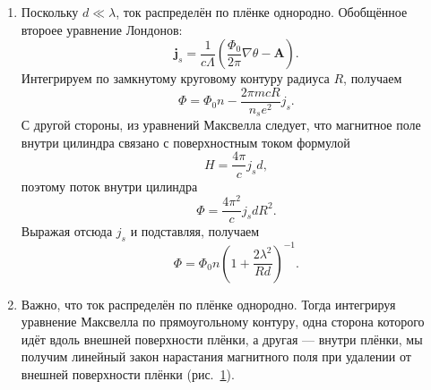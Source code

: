 \documentclass[a4paper]{article}
\begin{document}
\begin{hiProb}[Т9-7]
\end{hiProb}
\begin{sol}
\renewcommand{\labelenumi}{\asbuk{enumi})}
\begin{enumerate}
\item Поскольку $d \ll \lambda$, ток распределён по
	плёнке однородно. Обобщённое второее
	уравнение Лондонов:
	\[
		\mathbf{j}_s= \frac{1}{c\Lambda} \left( 
		\frac{\Phi_0}{2\pi} \nabla 
	\theta - \mathbf{A}\right) 
	.\] 
	Интегрируем по замкнутому круговому контуру
	радиуса $R$, получаем
	\[
	\Phi= \Phi_0 n - \frac{2\pi m c R}{n_s e^2}j_s
	.\] 
	С другой стороны, из уравнений Максвелла следует, что
	магнитное поле внутри цилиндра связано с поверхностным
	током формулой
	\[
	H= \frac{4\pi}{c} j_s d
	,\] 
поэтому поток внутри цилиндра
\[
\Phi= \frac{4\pi^2}{c}j_s d R^2
.\] 
Выражая отсюда $j_s$ и подставляя, получаем
\[
	\Phi= \Phi_0 n \left( 
	1+ \frac{2\lambda^2}{R d}\right) ^{-1}
.\] 
\item 
	Важно, что ток распределён по плёнке однородно.
	Тогда интегрируя уравнение Максвелла по прямоугольному
	контуру, одна сторона которого идёт вдоль внешней
	поверхности плёнки, а другая --- внутри плёнки,
	мы получим линейный закон нарастания магнитного поля при
	удалении от внешней поверхности плёнки (рис.~\ref{fig:1}).
\begin{figure}[ht]
    \centering
    \caption{}
    \label{fig:1}
\end{figure}
\end{enumerate}
\end{sol}
\end{document}
